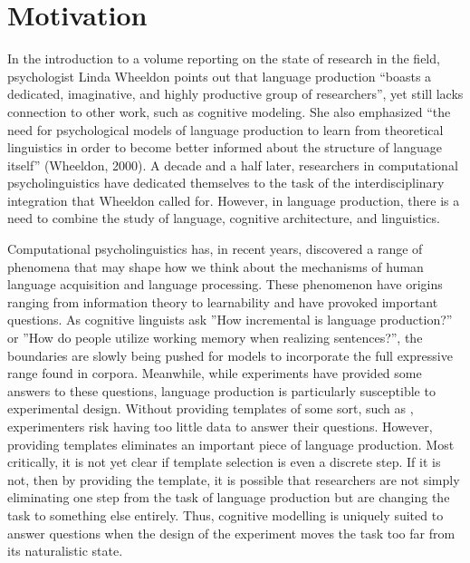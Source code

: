 \section{Motivation}
In the introduction to a volume reporting on the state of research in the field, psychologist Linda Wheeldon points out that language production “boasts a dedicated, imaginative, and highly productive group of researchers”, yet still lacks connection to other work, such as cognitive modeling. She also emphasized “the need for psychological models of language production to learn from theoretical linguistics in order to become better informed about the structure of language itself” (Wheeldon, 2000). A decade and a half later, researchers in computational psycholinguistics have dedicated themselves to the task of the interdisciplinary integration that Wheeldon called for. However, in language production, there is a need to combine the study of language, cognitive architecture, and linguistics.

Computational psycholinguistics has, in recent years, discovered a range of phenomena that may shape how we think about the mechanisms of human language acquisition and language processing. These phenomenon have origins ranging from information theory to learnability and have provoked important questions. As cognitive linguists ask ”How incremental is language production?” or ”How do people utilize working memory when realizing sentences?”, the boundaries are slowly being pushed for models to incorporate the full expressive range found in corpora. Meanwhile, while experiments have provided some answers to these questions, language production is particularly susceptible to experimental design. Without providing templates of some sort, such as \citet{sums-incr}\citet{prod-exp}, experimenters risk having too little data to answer their questions. However, providing templates eliminates an important piece of language production. Most critically, it is not yet clear if template selection is even a discrete step. If it is not, then by providing the template, it is possible that researchers are not simply eliminating one step from the task of language production but are changing the task to something else entirely. Thus, cognitive modelling is uniquely suited to answer questions when the design of the experiment moves the task too far from its naturalistic state. 

